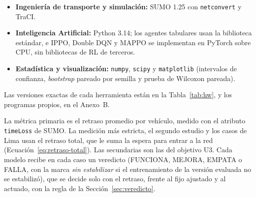 
\begin{itemize}
    \item \textbf{Ingeniería de transporte y simulación:} SUMO 1.25 con \texttt{netconvert} y TraCI.
    \item \textbf{Inteligencia Artificial:} Python 3.14; los agentes tabulares usan la biblioteca estándar, e IPPO, Double DQN y MAPPO se implementan en PyTorch sobre CPU, sin bibliotecas de RL de terceros.
    \item \textbf{Estadística y visualización:} \texttt{numpy}, \texttt{scipy} y \texttt{matplotlib} (intervalos de confianza, \textit{bootstrap} pareado por semilla y prueba de Wilcoxon pareada).
\end{itemize}
Las versiones exactas de cada herramienta están en la Tabla~\ref{tab:hw}, y los programas propios, en el Anexo~B.


La métrica primaria es el retraso promedio por vehículo, medido con el atributo \texttt{timeLoss} de SUMO. La medición más estricta, el segundo estudio y los casos de Lima usan el retraso total, que le suma la espera para entrar a la red (Ecuación~\ref{eq:retraso-total}). Las secundarias son las del objetivo U3. Cada modelo recibe en cada caso un veredicto (FUNCIONA, MEJORA, EMPATA o FALLA, con la marca \emph{sin estabilizar} si el entrenamiento de la versión evaluada no se estabilizó), que se decide solo con el retraso, frente al fijo ajustado y al actuado, con la regla de la Sección~\ref{sec:veredicto}.


